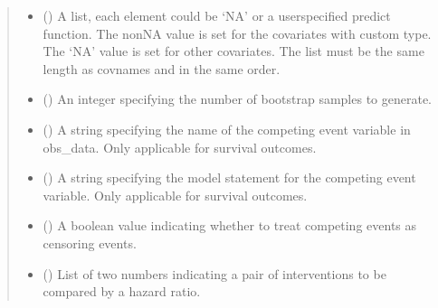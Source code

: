\documentclass[letterpaper,10pt,english]{sphinxmanual}
\begin{document}
\begin{fulllineitems}
\begin{quote}
\begin{description}
\begin{itemize}
\item {} 
\sphinxAtStartPar
{} (\sphinxstyleliteralemphasis{\sphinxupquote{, }}) \textendash{} A list, each element could be ‘NA’ or a user\sphinxhyphen{}specified predict function. The non\sphinxhyphen{}NA value is set
for the covariates with custom type. The ‘NA’ value is set for other covariates. The list must be the
same length as covnames and in the same order.

\item {} 
\sphinxAtStartPar
{} (\sphinxstyleliteralemphasis{\sphinxupquote{, }}) \textendash{} An integer specifying the number of bootstrap samples to generate.

\item {} 
\sphinxAtStartPar
{} (\sphinxstyleliteralemphasis{\sphinxupquote{, }}) \textendash{} A string specifying the name of the competing event variable in obs\_data. Only applicable for survival outcomes.

\item {} 
\sphinxAtStartPar
{} (\sphinxstyleliteralemphasis{\sphinxupquote{, }}) \textendash{} A string specifying the model statement for the competing event variable. Only applicable for survival outcomes.

\item {} 
\sphinxAtStartPar
{} (\sphinxstyleliteralemphasis{\sphinxupquote{, }}) \textendash{} A boolean value indicating whether to treat competing events as censoring events.

\item {} 
\sphinxAtStartPar
{} (\sphinxstyleliteralemphasis{\sphinxupquote{, }}) \textendash{} List of two numbers indicating a pair of interventions to be compared by a hazard ratio.


\end{itemize}
\end{description}
\end{quote}
\end{fulllineitems}
\end{document}
